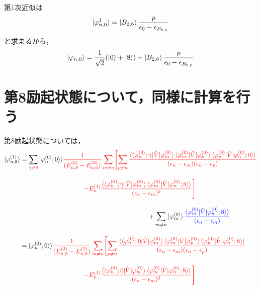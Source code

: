 第1次近似は
\begin{equation}
    \ket{\varphi_{n,0}^{1}} = \ket{B_{2,6}}\frac{p}{\epsilon_0-\epsilon_{B_{2,6}}}
\end{equation}
と求まるから，
\begin{equation}
     \ket{\varphi_{n,0}} 
     = \frac{1}{\sqrt{2}}(\ket{0}+\ket{8}) + \ket{B_{2,6}}\frac{p}{\epsilon_0-\epsilon_{B_{2,6}}}
\end{equation}






\section*{第8励起状態について，同様に計算を行う}
第8励起状態については，
\begin{align}
    \ket{\varphi_{n,8}^{(1)}}
    &=
    \sum_{\textcolor{red}{\gamma\neq8}}|\varphi^{(0)}_n;0\rangle\rangle
    \textcolor{red}{\frac{1}{(E^{(2)}_{n,8}-E^{(2)}_{n,0})}
    \sum_{m\neq n}\Biggl[\sum_{p\neq n}
    \frac{\langle\braket{\varphi^{(0)}_{n};\gamma|\hat{V}|\varphi^{(0)}_m}
    \langle{\varphi^{(0)}_{m}|\hat{V}|\varphi^{(0)}_p}\rangle
    \braket{\varphi^{(0)}_{p}|\hat{V}|\varphi^{(0)}_n;0}\rangle}
    {(\epsilon_n-\epsilon_m)(\epsilon_n-\epsilon_p)}}\nn[10pt]
    &\hspace{100pt}
    \textcolor{red}{-E^{(1)}_n
    \frac{\langle\braket{\varphi^{(0)}_{n};\gamma|\hat{V}|\varphi^{(0)}_m}
    \braket{\varphi^{(0)}_{m}|\hat{V}|\varphi^{(0)}_n;8}\rangle}{(\epsilon_n-\epsilon_m)^2}
    \Biggr]}
    \nn[10pt]
    &\hspace{200pt}+
    \sum_{m\neq n}\ket{\varphi^{(0)}_m}
    \textcolor{blue}{
    \frac{\braket{\varphi^{(0)}_{m}|\hat{V}|\varphi^{(0)}_n;8}\rangle}{(\epsilon_n-\epsilon_m)}}\nn[10pt]
    &=
    |\varphi^{(0)}_n;0\rangle\rangle
    \textcolor{red}{\frac{1}{(E^{(2)}_{n,8}-E^{(2)}_{n,0})}
    \sum_{m\neq n}\Biggl[\sum_{p\neq n}
    \frac{\langle\braket{\varphi^{(0)}_{n};0|\hat{V}|\varphi^{(0)}_m}
    \langle{\varphi^{(0)}_{m}|\hat{V}|\varphi^{(0)}_p}\rangle
    \braket{\varphi^{(0)}_{p}|\hat{V}|\varphi^{(0)}_n;8}\rangle}
    {(\epsilon_n-\epsilon_m)(\epsilon_n-\epsilon_p)}}\nn[10pt]
    &\hspace{100pt}
    \textcolor{red}{-E^{(1)}_n
    \frac{\langle\braket{\varphi^{(0)}_{n};0|\hat{V}|\varphi^{(0)}_m}
    \braket{\varphi^{(0)}_{m}|\hat{V}|\varphi^{(0)}_n;8}\rangle}{(\epsilon_n-\epsilon_m)^2}
    \Biggr]}
    \nn[10pt]

\end{align}
